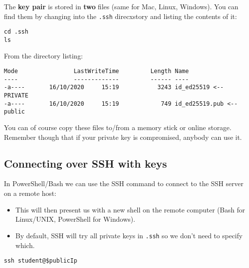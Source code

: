 \documentclass[slides]{pgnotes}
\begin{document}
The \textbf{key pair} is stored in \textbf{two} files (same for Mac, Linux, Windows).
You can find them by changing into the \texttt{.ssh} direcxstory and listing the contents of it:

\begin{verbatim}
cd .ssh
ls
\end{verbatim}

From the directory listing:

\begin{verbatim}
Mode                LastWriteTime         Length Name
----                -------------         ------ ----
-a----       16/10/2020     15:19           3243 id_ed25519 <-- PRIVATE
-a----       16/10/2020     15:19            749 id_ed25519.pub <-- public
\end{verbatim}


You can of course copy these files to/from a memory stick or online storage.
Remember though that if your private key is compromised, anybody can use it.





\subsection{Connecting over SSH with keys}
\label{sec:connecting-over-ssh-with-keys}

In PowerShell/Bash we can use the SSH command to connect to the SSH server on a remote host:
\begin{itemize}
\item This will then present us with a new shell on the remote computer (Bash for Linux/UNIX, PowerShell for Windows).
\item By default, SSH will try all private keys in \texttt{.ssh} so we don't need to specify which.
\end{itemize}

\begin{verbatim}
ssh student@$publicIp 
\end{verbatim}
\end{document}
